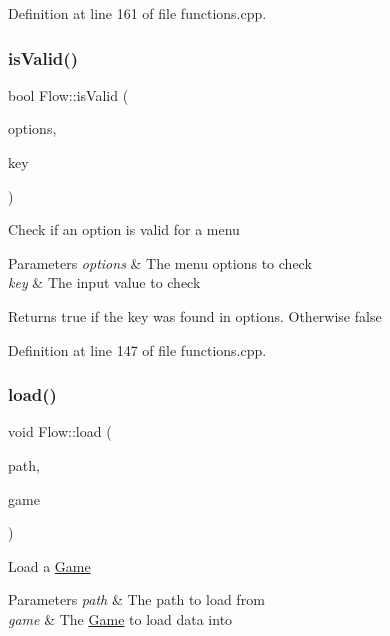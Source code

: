 Definition at line 161 of file functions.\+cpp.

\hypertarget{namespace_flow_a479c1b994bc40845aabea05a48e229ba}{}\label{namespace_flow_a479c1b994bc40845aabea05a48e229ba} 
\subsubsection{\texorpdfstring{is\+Valid()}{isValid()}}
{\footnotesize\ttfamily bool Flow\+::is\+Valid (\begin{DoxyParamCaption}\item[{const \hyperlink{class_collections_1_1_linked_list}{Collections\+::\+Linked\+List}$<$ std\+::string $>$ \&}]{options,  }\item[{char}]{key }\end{DoxyParamCaption})}

Check if an option is valid for a menu 
\begin{DoxyParams}{Parameters}
{\em options} & The menu options to check \\
\hline
{\em key} & The input value to check \\
\hline
\end{DoxyParams}
\begin{DoxyReturn}{Returns}
true if the key was found in options. Otherwise false 
\end{DoxyReturn}


Definition at line 147 of file functions.\+cpp.

\hypertarget{namespace_flow_ae8f5010f6747afed79b8305689e12fe8}{}\label{namespace_flow_ae8f5010f6747afed79b8305689e12fe8} 
\subsubsection{\texorpdfstring{load()}{load()}}
{\footnotesize\ttfamily void Flow\+::load (\begin{DoxyParamCaption}\item[{const std\+::string \&}]{path,  }\item[{\hyperlink{class_flow_1_1_game}{Game} \&}]{game }\end{DoxyParamCaption})}

Load a \hyperlink{class_flow_1_1_game}{Game} 
\begin{DoxyParams}{Parameters}
{\em path} & The path to load from \\
\hline
{\em game} & The \hyperlink{class_flow_1_1_game}{Game} to load data into \\
\hline
\end{DoxyParams}


